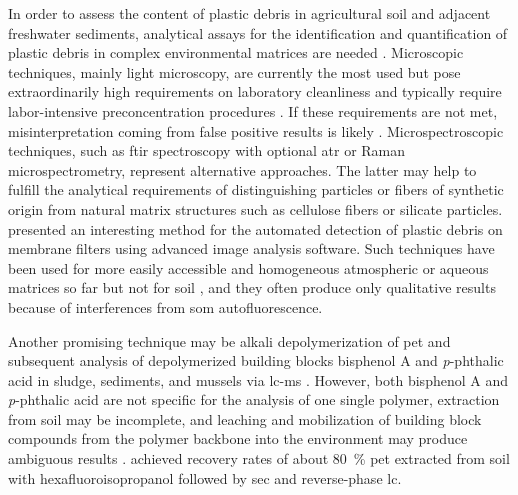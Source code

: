 In order to assess the content of plastic debris in agricultural soil and adjacent freshwater sediments, analytical assays for the identification and quantification of plastic debris in complex environmental matrices are needed \citep{BlasingPlastics2018}. Microscopic techniques, mainly light microscopy, are currently the most used but pose extraordinarily high requirements on laboratory cleanliness and typically require labor-intensive preconcentration procedures \citep{WoodallUsing2015}. If these requirements are not
met, misinterpretation coming from false positive results is likely \citep{LachenmeierMicroplastic2015}. Microspectroscopic techniques, such as \ac{ftir} spectroscopy with optional \ac{atr} or Raman microspectrometry, represent alternative approaches. The latter may help to fulfill the analytical requirements of distinguishing particles or fibers of synthetic origin from natural matrix structures such as cellulose fibers or silicate particles. \citet{PrimpkeAutomated2017} presented an interesting method for the automated detection of plastic debris on membrane filters using advanced image analysis software. Such techniques have been used for more easily accessible and homogeneous atmospheric or aqueous matrices so far but not for soil \citep{IoakeimidisDegradation2016,FischerIdentification2015,Comnea-StancuIdentification2016}, and they often produce only qualitative results \citep{BlasingPlastics2018} because of interferences from \ac{som} autofluorescence.

Another promising technique may be alkali depolymerization of \ac{pet} and subsequent analysis of depolymerized building blocks bisphenol A and \textit{p}-phthalic acid in sludge, sediments, and mussels via \ac{lc-ms} \citep{WangSimple2017}. However, both bisphenol A and \textit{p}-phthalic acid are not specific for the analysis of one single polymer, extraction from soil may be incomplete, and leaching and mobilization of building block compounds from the polymer backbone into the environment may produce ambiguous results \citep{WangSimple2017}. \citet{ElertComparison2017} achieved recovery rates of about \SI{80}{\percent} \ac{pet} extracted from soil with hexafluoroisopropanol followed by \ac{sec} and reverse-phase \ac{lc}.

